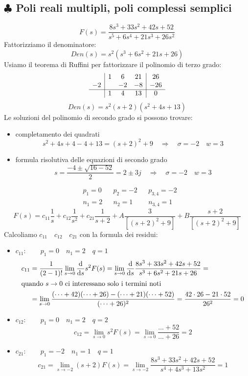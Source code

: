 \subsection{$ \clubsuit $ Poli reali multipli, poli complessi semplici}
\[ F(s) = \frac{8s^3+33s^2+42s+52}{s^5+6s^4+21s^3+26s^2} \]
Fattorizziamo il denominatore:
\[ Den(s) = s^2(s^3+6s^2+21s+26) \]
Usiamo il teorema di Ruffini per fattorizzare il polinomio di terzo grado:
\[ 
\begin{array}{c|ccc|c}
		& 1 & 6  & 21 & 26  \\ 
	-2 	&   & -2 & -8 & -26 \\ \cline{1-5}
		& 1 & 4  & 13 & 0
\end{array} 
\]
\[ Den(s) = s^2(s+2)(s^2+4s+13) \]
Le soluzioni del polinomio di secondo grado si possono trovare:
\begin{itemize}
	\item completamento dei quadrati
	\[ s^2+4s+4-4+13 = (s+2)^2+9 \quad \Rightarrow \quad \sigma=-2 \quad w=3 \]
	\item formula risolutiva delle equazioni di secondo grado
	\[ s = \frac{-4 \pm \sqrt{16-52}}{2} = 2 \pm 3j \quad \Rightarrow \quad \sigma=-2 \quad w=3 \]
\end{itemize}
\begin{align*}
	&p_1 = 0 &&  p_2 = -2 && p_{3,4} = -2\\
	&n_1 = 2 && n_2 = 1 && n_{3,4} = 1
\end{align*}
\[ F(s) = c_{11} \frac{1}{s} + c_{12} \frac{1}{s^2} + c_{21} \frac{1}{s+2} + A \frac{3}{[(s+2)^2+9]} + B \frac{s+2}{[(s+2)^2+9]} \]
\smallskip
Calcoliamo $ c_{11} \quad c_{12} \quad c_{21} $ con la formula dei residui:
\begin{itemize}
	\item $ c_{11}: \qquad p_1=0 \quad n_1=2 \quad q=1 $
	\begin{align*}
		c_{11} &= \frac{1}{(2-1)!} \lim\limits_{s \rightarrow 0} \frac{\mathrm{d} }{\mathrm{d} s} s^2F(s) =	\lim\limits_{s \rightarrow 0} \frac{\mathrm{d} }{\mathrm{d} s} \frac{8s^3+33s^2+42s+52}{s^3+6s^2+21s+26} = \\
		\intertext{quando $ s \rightarrow 0 $ ci interessano solo i termini noti}
		&= \lim\limits_{s \rightarrow 0} \frac{(\dots + 42)(\dots + 26)-(\dots+21)(\dots+52)}{(\dots+26)^2} = \frac{42 \cdot 26 - 21 \cdot 52}{26^2} = 0
	\end{align*}
	\item $ c_{12}: \qquad p_1=0 \quad n_1=2 \quad q=2 $
	\[ c_{12}= \lim\limits_{s \rightarrow 0} s^2F(s) = \lim\limits_{s \rightarrow 0} \frac{\dots + 52}{\dots + 26} = 2 \]
	\item $ c_{21}: \qquad p_1=-2 \quad n_1=1 \quad q=1 $
	\[ c_{21} = \lim\limits_{s \rightarrow -2} (s+2)F(s) = \lim\limits_{s \rightarrow -2} \frac{8s^3+33s^2+42s+52}{s^4+4s^3+13s^2} = 1\]
\end{itemize}
